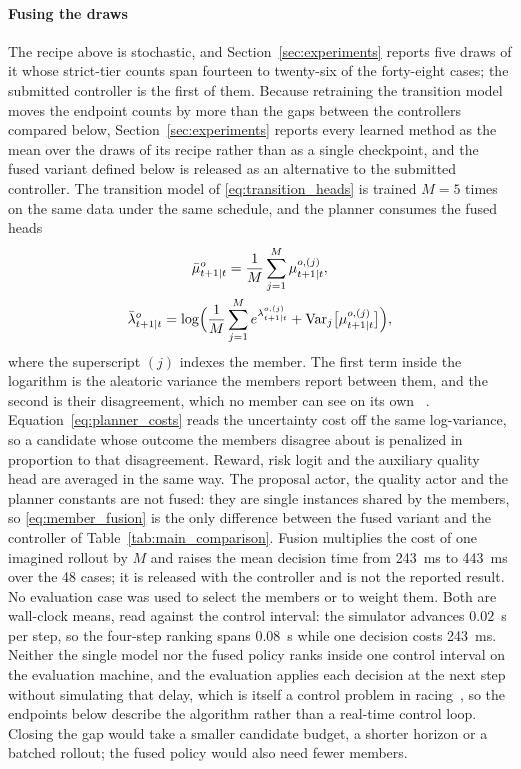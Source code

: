 \documentclass[journal]{IEEEtran}
\newcounter{algorithm}
\begin{document}
\paragraph{Fusing the draws}
The recipe above is stochastic, and Section~\ref{sec:experiments} reports five
draws of it whose strict-tier counts span fourteen to twenty-six of the
forty-eight cases; the submitted controller is the first of them. Because
retraining the transition model moves the endpoint counts by more than the gaps
between the controllers compared below, Section~\ref{sec:experiments} reports
every learned method as the mean over the draws of its recipe rather than as a
single checkpoint, and the fused variant defined below is released as an
alternative to the submitted controller. The transition model of
\eqref{eq:transition_heads} is trained $M=5$ times on the same data under the
same schedule, and the planner consumes the fused heads
\begin{equation}
\begin{gathered}
 \bar\mu^{o}_{t+1|t}=\frac{1}{M}\sum_{j=1}^{M}\mu^{o,(j)}_{t+1|t},\\
 \bar\lambda^{o}_{t+1|t}=\log\Bigl(\frac{1}{M}\sum_{j=1}^{M}
 e^{\lambda^{o,(j)}_{t+1|t}}
 +\operatorname{Var}_{j}\bigl[\mu^{o,(j)}_{t+1|t}\bigr]\Bigr),
\end{gathered}
\label{eq:member_fusion}
\end{equation}
where the superscript $(j)$ indexes the member. The first term inside the
logarithm is the aleatoric variance the members report between them, and the
second is their disagreement, which no member can see on its own
~\cite{lakshminarayanan2017simple,chua2018pets}.
Equation~\eqref{eq:planner_costs} reads the uncertainty cost off the same
log-variance, so a candidate whose outcome the members disagree about is
penalized in proportion to that disagreement. Reward, risk logit and the
auxiliary quality head are averaged in the same way. The proposal actor, the
quality actor and the planner constants are not fused: they are single
instances shared by the members, so \eqref{eq:member_fusion} is the only
difference between the fused variant and the controller of
Table~\ref{tab:main_comparison}.
Fusion multiplies the cost of one imagined rollout by $M$ and raises the mean
decision time from 243~ms to 443~ms over the 48 cases; it is released with the
controller and is not the reported result. No evaluation case
was used to select the members or to weight them. Both are wall-clock means,
read against the control interval: the simulator advances $0.02$~s per step, so
the four-step ranking spans $0.08$~s while one decision costs 243~ms. Neither the
single model nor the fused policy ranks inside one control interval on the
evaluation machine, and the evaluation applies each decision at the next step
without simulating that delay, which is itself a control problem in
racing~\cite{kalaria2024delay}, so the endpoints below describe the algorithm
rather than a real-time control loop. Closing the gap would take a smaller
candidate budget, a shorter horizon or a batched rollout; the fused policy would
also need fewer members.
\end{document}
